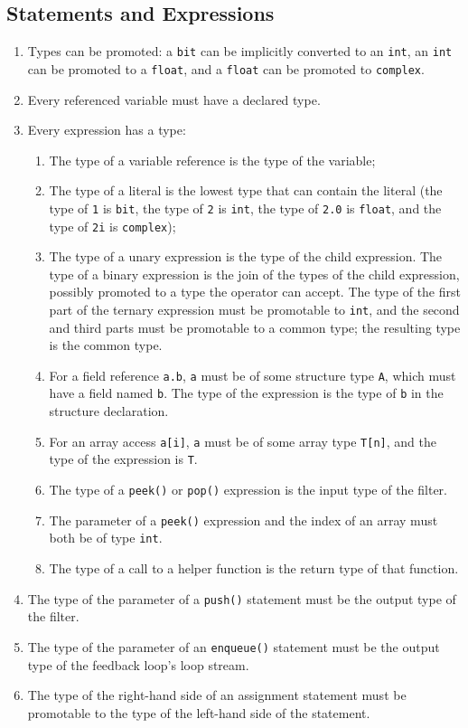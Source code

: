 \documentclass[11pt]{article}
\begin{document}
\subsection{Statements and Expressions}

\begin{enumerate}
\item Types can be promoted: a \lstinline|bit| can be implicitly
  converted to an \lstinline|int|, an \lstinline|int| can be promoted
  to a \lstinline|float|, and a \lstinline|float| can be promoted to
  \lstinline|complex|.
\item Every referenced variable must have a declared type.
\item Every expression has a type:
\begin{enumerate}
\item The type of a variable reference is the type of the variable;
\item The type of a literal is the lowest type that can contain the
  literal (the type of \lstinline|1| is \lstinline|bit|, the type of
  \lstinline|2| is \lstinline|int|, the type of \lstinline|2.0| is
  \lstinline|float|, and the type of \lstinline|2i| is
  \lstinline|complex|);
\item The type of a unary expression is the type of the child
  expression.  The type of a binary expression is the join of the
  types of the child expression, possibly promoted to a type the
  operator can accept.  The type of the first part of the ternary
  expression must be promotable to \lstinline|int|, and the second and
  third parts must be promotable to a common type; the resulting type
  is the common type.
\item For a field reference \lstinline|a.b|, \lstinline|a| must be of
  some structure type \lstinline|A|, which must have a field named
  \lstinline|b|.  The type of the expression is the type of
  \lstinline|b| in the structure declaration.
\item For an array access \lstinline|a[i]|, \lstinline|a| must be of
  some array type \lstinline|T[n]|, and the type of the expression is
  \lstinline|T|.
\item The type of a \lstinline|peek()| or \lstinline|pop()| expression
  is the input type of the filter.
\item The parameter of a \lstinline|peek()| expression and the index
  of an array must both be of type \lstinline|int|.
\item The type of a call to a helper function is the return type of
  that function.
\end{enumerate}
\item The type of the parameter of a \lstinline|push()| statement must
  be the output type of the filter.
\item The type of the parameter of an \lstinline|enqueue()| statement
  must be the output type of the feedback loop's loop stream.
\item The type of the right-hand side of an assignment statement must
  be promotable to the type of the left-hand side of the statement.
\end{enumerate}
\end{document}
